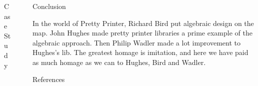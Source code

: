 \documentclass[final]{beamer}
\newlength{\sepwid}
\newlength{\onecolwid}
\newlength{\twocolwid}
\begin{document}
\begin{frame}[t]
\begin{columns}[t]
\begin{column}{\twocolwid}
\begin{columns}[t,totalwidth=\twocolwid]
\begin{column}{\onecolwid}
\begin{block}{Case Study}
\end{block}


\end{column} %

\end{columns} %

\end{column} %

\begin{column}{\sepwid}\end{column} %

\begin{column}{\onecolwid} %


\begin{block}{Conclusion}

In the world of Pretty Printer, Richard Bird put algebraic design on the map. John Hughes made pretty printer libraries a prime example of the algebraic approach. Then Philip Wadler made a lot improvement to Hughes's lib. The greatest homage is imitation, and here we have paid as much homage as we can to Hughes, Bird and Wadler.

\end{block}



\begin{block}{References}

\nocite{*} %
\small{
\vspace{0.75in}}

\end{block}




\end{column}
\end{columns}
\end{frame}
\end{document}
